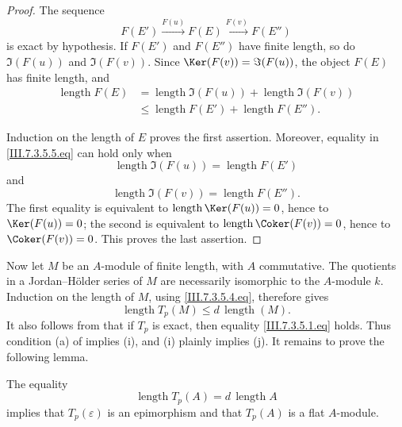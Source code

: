 \begin{proof}
The sequence
\[
  F(E')\xrightarrow{F(u)}F(E)\xrightarrow{F(v)}F(E'')
\]
is exact by hypothesis.  If $F(E')$ and $F(E'')$ have finite
length, so do $\Im(F(u))$ and $\Im(F(v))$.  Since
$\Ker(F(v))=\Im(F(u))$, the object $F(E)$ has finite length,
and
\[
  \begin{split}
  \operatorname{length}F(E)
  &=
  \operatorname{length}\Im(F(u))
  +
  \operatorname{length}\Im(F(v))
  \\
  &\leq
  \operatorname{length}F(E')
  +
  \operatorname{length}F(E'').
  \end{split}
  \tag{7.3.5.5}\label{III.7.3.5.5.eq}
\]


Induction on the length of $E$ proves the first assertion.
Moreover, equality in \eqref{III.7.3.5.5.eq} can hold only when
\[
  \operatorname{length}\Im(F(u))
  =
  \operatorname{length}F(E')
\]
and
\[
  \operatorname{length}\Im(F(v))
  =
  \operatorname{length}F(E'').
\]
The first equality is equivalent to
$\operatorname{length}\Ker(F(u))=0$, hence to $\Ker(F(u))=0$;
the second is equivalent to
$\operatorname{length}\Coker(F(v))=0$, hence to
$\Coker(F(v))=0$.  This proves the last assertion.
\end{proof}

Now let $M$ be an $A$-module of finite length, with $A$
commutative.  The quotients in a Jordan--H\"older series of
$M$ are necessarily isomorphic to the $A$-module $k$.
Induction on the length of $M$, using
\eqref{III.7.3.5.4.eq}, therefore gives
\[
  \operatorname{length}T_p(M)
  \leq
  d\,\operatorname{length}(M).
  \tag{7.3.5.6}\label{III.7.3.5.6.eq}
\]
It also follows from  that if $T_p$ is exact,
then equality \eqref{III.7.3.5.1.eq} holds.  Thus condition
(a) of  implies (i), and (i) plainly implies
(j).  It remains to prove the following lemma.

\begin{lemma}[7.3.5.7]
\label{III.7.3.5.7}
The equality
\[
  \operatorname{length}T_p(A)
  =
  d\,\operatorname{length}A
\]
implies that $T_p(\varepsilon)$ is an epimorphism and that
$T_p(A)$ is a flat $A$-module.
\end{lemma}

